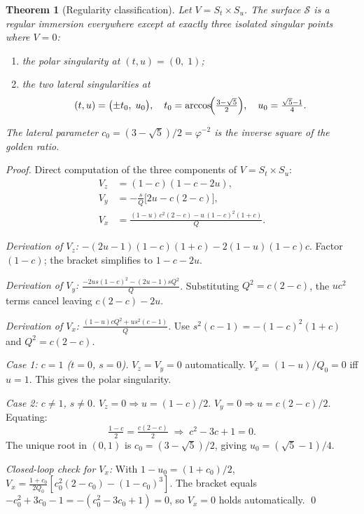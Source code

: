 \documentclass[12pt]{article}
\newtheorem{theorem}{Theorem}[section]
\begin{document}
\begin{theorem}[Regularity classification]
\label{thm:regclass}
Let $V = S_t\times S_u$.
The surface $\mathcal{S}$ is a regular immersion everywhere except at
exactly three isolated singular points where $V=0$:
\begin{enumerate}
\item the \emph{polar singularity} at $(t,u) = (0,\;1)$;
\item the two \emph{lateral singularities} at
  \[
    (t,u) = \bigl(\pm t_0,\;u_0\bigr),
    \quad
    t_0 = \arccos\!\Bigl(\tfrac{3-\sqrt5}{2}\Bigr),
    \quad
    u_0 = \tfrac{\sqrt5-1}{4}.
  \]
\end{enumerate}
The lateral parameter $c_0 = (3-\sqrt5)/2 = \varphi^{-2}$
is the inverse square of the golden ratio.
\end{theorem}

\begin{proof}
Direct computation of the three components of $V = S_t\times S_u$:
\begin{align}
  V_z &= (1-c)(1-c-2u), \label{eq:Vz}\\
  V_y &= -\tfrac{s}{Q}\bigl[2u-c(2-c)\bigr], \label{eq:Vy}\\
  V_x &= \frac{(1-u)\,c^2(2-c) - u\,(1-c)^2(1+c)}{Q}. \label{eq:Vx}
\end{align}

\textit{Derivation of $V_z$:}
$-(2u-1)(1-c)(1+c)-2(1-u)(1-c)c$.
Factor $(1-c)$; the bracket simplifies to $1-c-2u$.

\textit{Derivation of $V_y$:}
$\tfrac{-2us(1-c)^2-(2u-1)sQ^2}{Q}$.
Substituting $Q^2=c(2-c)$, the $uc^2$ terms cancel leaving $c(2-c)-2u$.

\textit{Derivation of $V_x$:}
$\tfrac{(1-u)cQ^2+us^2(c-1)}{Q}$.
Use $s^2(c-1)=-(1-c)^2(1+c)$ and $Q^2=c(2-c)$.

\medskip
\noindent\textit{Case 1: $c=1$ ($t=0$, $s=0$).}
$V_z=V_y=0$ automatically.
$V_x=(1-u)/Q_0=0$ iff $u=1$. This gives the polar singularity.

\noindent\textit{Case 2: $c\ne1$, $s\ne0$.}
$V_z=0 \Rightarrow u=(1-c)/2$.
$V_y=0 \Rightarrow u=c(2-c)/2$.
Equating:
\[
  \tfrac{1-c}{2}=\tfrac{c(2-c)}{2}
  \;\Longrightarrow\;
  c^2-3c+1=0.
\]
The unique root in $(0,1)$ is $c_0=(3-\sqrt5)/2$,
giving $u_0=(\sqrt5-1)/4$.

\noindent\textit{Closed-loop check for $V_x$:}
With $1-u_0=(1+c_0)/2$,
$V_x = \tfrac{1+c_0}{2Q_0}[c_0^2(2-c_0)-(1-c_0)^3]$.
The bracket equals $-c_0^2+3c_0-1=-(c_0^2-3c_0+1)=0$,
so $V_x=0$ holds automatically. \qed
\end{proof}
\end{document}
